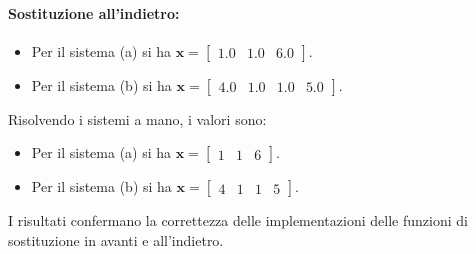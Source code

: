 \documentclass[letterpaper, 12pt]{article}
\numberwithin{equation}{section}    %
\begin{document}
\paragraph{Sostituzione all'indietro:}
\begin{itemize}
    \item Per il sistema (a) si ha $\mathbf{x} = \begin{bmatrix} 1.0 & 1.0 & 6.0 \end{bmatrix}$.
    \item Per il sistema (b) si ha $\mathbf{x} = \begin{bmatrix} 4.0 & 1.0 & 1.0 & 5.0 \end{bmatrix}$.
\end{itemize}
Risolvendo i sistemi a mano, i valori sono:
\begin{itemize}
    \item Per il sistema (a) si ha $\mathbf{x} = \begin{bmatrix} 1 & 1 & 6 \end{bmatrix}$.
    \item Per il sistema (b) si ha $\mathbf{x} = \begin{bmatrix} 4 & 1 & 1 & 5 \end{bmatrix}$.
\end{itemize}
I risultati confermano la correttezza delle implementazioni delle funzioni di sostituzione in avanti e all'indietro.
\end{document}
